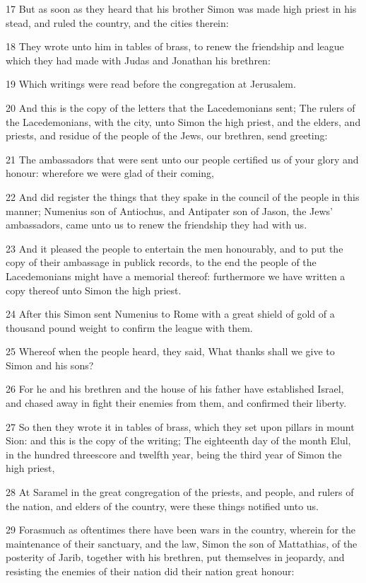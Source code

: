 \par 17 But as soon as they heard that his brother Simon was made high priest in his stead, and ruled the country, and the cities therein:
\par 18 They wrote unto him in tables of brass, to renew the friendship and league which they had made with Judas and Jonathan his brethren:
\par 19 Which writings were read before the congregation at Jerusalem.
\par 20 And this is the copy of the letters that the Lacedemonians sent; The rulers of the Lacedemonians, with the city, unto Simon the high priest, and the elders, and priests, and residue of the people of the Jews, our brethren, send greeting:
\par 21 The ambassadors that were sent unto our people certified us of your glory and honour: wherefore we were glad of their coming,
\par 22 And did register the things that they spake in the council of the people in this manner; Numenius son of Antiochus, and Antipater son of Jason, the Jews' ambassadors, came unto us to renew the friendship they had with us.
\par 23 And it pleased the people to entertain the men honourably, and to put the copy of their ambassage in publick records, to the end the people of the Lacedemonians might have a memorial thereof: furthermore we have written a copy thereof unto Simon the high priest.
\par 24 After this Simon sent Numenius to Rome with a great shield of gold of a thousand pound weight to confirm the league with them.
\par 25 Whereof when the people heard, they said, What thanks shall we give to Simon and his sons?
\par 26 For he and his brethren and the house of his father have established Israel, and chased away in fight their enemies from them, and confirmed their liberty.
\par 27 So then they wrote it in tables of brass, which they set upon pillars in mount Sion: and this is the copy of the writing; The eighteenth day of the month Elul, in the hundred threescore and twelfth year, being the third year of Simon the high priest,
\par 28 At Saramel in the great congregation of the priests, and people, and rulers of the nation, and elders of the country, were these things notified unto us.
\par 29 Forasmuch as oftentimes there have been wars in the country, wherein for the maintenance of their sanctuary, and the law, Simon the son of Mattathias, of the posterity of Jarib, together with his brethren, put themselves in jeopardy, and resisting the enemies of their nation did their nation great honour:
